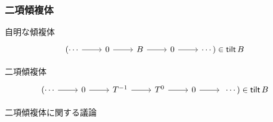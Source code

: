 \documentclass[dvipdfmx,10pt,handout
]{beamer}
\newcommand{\tilt}{\operatorname{\mathsf{tilt}}}
\newcommand{\twotilt}{\operatorname{\mathsf{2-tilt}}}
\newcommand{\stautilt}{\operatorname{\mathsf{s\tau-tilt}}}
\begin{document}
\begin{frame}
    \frametitle{二項傾複体}
    \begin{exampleblock}{自明な傾複体}
        \[\begin{tikzcd}[ampersand replacement=\&]
                (\cdots\ar[r]\& 0\ar[r] \& B\ar[r]\&0\ar[r]\& \cdots)\in \tilt B
            \end{tikzcd}\]
    \end{exampleblock}
    \pause
    \begin{block}{二項傾複体}
        \[\begin{tikzcd}[ampersand replacement=\&]
                (\cdots\ar[r]\& 0\ar[r] \& T^{-1}\ar[r]\&T^0\ar[r]\&0\ar[r]\&\ \cdots)\in \tilt B
            \end{tikzcd}\]
    \end{block}
    \pause
    \pause
    \begin{exampleblock}{二項傾複体に関する議論}
    \end{exampleblock}
\end{frame}
\end{document}
